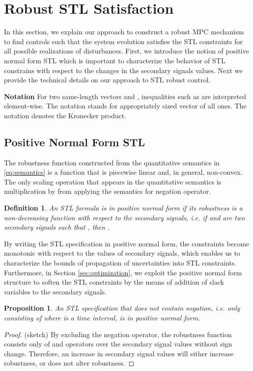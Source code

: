 \documentclass[letterpaper, 10 pt, conference]{ieeeconf}
\newtheorem{define}{Definition}
\newtheorem{proposition}{Proposition}
\begin{document}
\section{Robust STL Satisfaction}
\label{sec:robust}

In this section, we explain our approach to construct a robust MPC mechanism to find controls such that the system evolution satisfies the STL constraints for all possible realizations of disturbances. First, we introduce the notion of positive normal form STL which is important to characterize the behavior of STL constrains with respect to the changes in the secondary signals values. Next we provide the technical details on our approach to STL robust control. 

{\bf Notation} For two same-length vectors  and , inequalities such as  are interpreted element-wise. The notation  stands for appropriately sized vector of all ones. The notation  denotes the Kronecker product.

\subsection{Positive Normal Form STL}


The robustness function constructed from the quantitative semantics in \eqref{eq:semantics} is a  function that is piecewise linear and, in general, non-convex. The only scaling operation that appears in the quantitative semantics is multiplication by  from applying the semantics for negation operator. 





\begin{define}
An STL formula  is in \emph{positive normal form} if its robustness is a non-decreasing function with respect to the secondary signals, i.e. if  and  are two secondary signals such that , then . 
\end{define}
By writing the STL specification in positive normal form, the constraints become monotonic with respect to the values of secondary signals, which enables us to characterize the bounds of propagation of uncertainties into STL constraints. Furthermore, in Section \ref{sec:optimization}, we exploit the positive normal form structure to soften the STL constraints by the means of addition of slack variables to the secondary signals.   

\begin{proposition}
An STL specification that does not contain negation, i.e. only consisting of  where  is a time interval, is in positive normal form. 
\end{proposition}
\begin{proof}(sketch)
By excluding the negation operator, the robustness function consists only of  and  operators over the secondary signal values without sign change. Therefore, an increase in secondary signal values will either increase robustness, or does not alter robustness. 
\end{proof}
\end{document}
